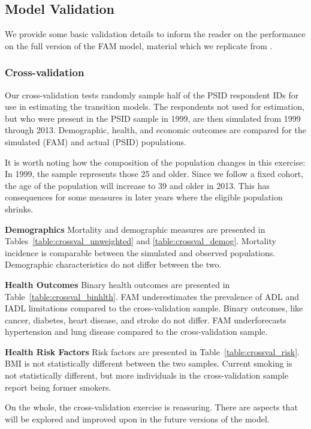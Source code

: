 \subsection{Model Validation}
\label{appendix:health-validation}
\noindent We provide some basic validation details to inform the reader on the performance on the full version of the FAM model, material which we replicate from \citet{Goldman_etal_2015_Future-Adult-Model}.

\subsubsection{Cross-validation}
\noindent Our cross-validation tests randomly sample half of the PSID respondent IDs for use in estimating the transition models. The respondents not used for estimation, but who were present in the PSID sample in 1999, are then simulated from 1999 through 2013. Demographic, health, and economic outcomes are compared for the simulated (FAM) and actual (PSID) populations.

\noindent It is worth noting how the composition of the population changes in this exercise: In 1999, the sample represents those 25 and older. Since we follow a fixed cohort, the age of the population will increase to 39 and older in 2013. This has consequences for some measures in later years where the eligible population shrinks.

\noindent\textbf{Demographics}
Mortality and demographic measures are presented in Tables~\ref{table:crossval_unweighted} and \ref{table:crossval_demog}. Mortality incidence is comparable between the simulated and observed populations. Demographic characteristics do not differ between the two.

\noindent\textbf{Health Outcomes}
Binary health outcomes are presented in Table~\ref{table:crossval_binhlth}. FAM underestimates the prevalence of ADL and IADL limitations compared to the cross-validation sample. Binary outcomes, like cancer, diabetes, heart disease, and stroke do not differ. FAM underforecasts hypertension and lung disease compared to the cross-validation sample.

\noindent\textbf{Health Risk Factors}
Risk factors are presented in Table~\ref{table:crossval_risk}. BMI is not statistically different between the two samples. Current smoking is not statistically different, but more individuals in the cross-validation sample report being former smokers.

\noindent On the whole, the cross-validation exercise is reassuring. There are aspects that will be explored and improved upon in the future versions of the model.

